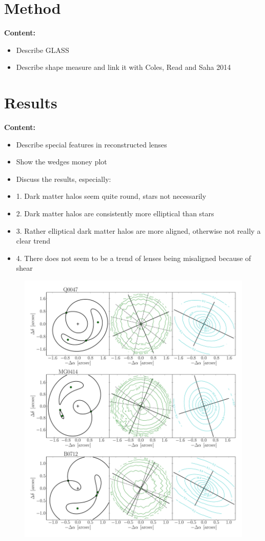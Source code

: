 \documentclass[useAMS,usenatbib]{mn2e}
\begin{document}
\section{Method}\label{sec:method}
\textbf{Content:}
\begin{itemize}
\item Describe GLASS
\item Describe shape measure and link it with Coles, Read and Saha 2014
\end{itemize}

\section{Results}\label{sec:results}
\textbf{Content:}
\begin{itemize}
\item Describe special features in reconstructed lenses
\item Show the wedges money plot
\item Discuss the results, especially:
\item 1. Dark matter halos seem quite round, stars not necessarily
\item 2. Dark matter halos are consistently more elliptical than stars
\item 3. Rather elliptical dark matter halos are more aligned, otherwise not really a clear trend
\item 4. There does not seem to be a trend of lenses being misaligned because of shear
\end{itemize}

\begin{figure}
  \centering
  \includegraphics[width=.8\linewidth]{Figures/AllLenses31.pdf}
  \caption[width=.65\linewidth]{}
  \label{fig:lensreconstruction1}
\end{figure}
\end{document}
